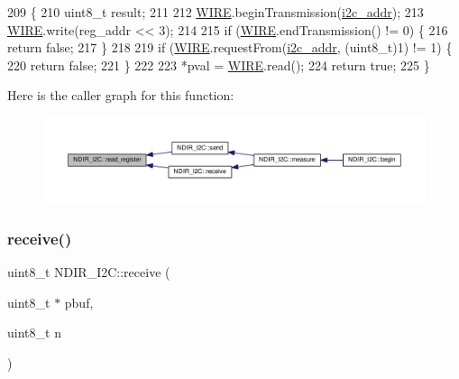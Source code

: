 \begin{DoxyCode}
209 \{
210     uint8\_t result;
211 
212     \hyperlink{_cool_n_d_i_r___i2_c_8cpp_a5fb65319d8f31c75826267805bb435d1}{WIRE}.beginTransmission(\hyperlink{class_n_d_i_r___i2_c_aac12069dd5a86a9ec6aa31ac9a44aabe}{i2c\_addr});
213     \hyperlink{_cool_n_d_i_r___i2_c_8cpp_a5fb65319d8f31c75826267805bb435d1}{WIRE}.write(reg\_addr << 3);
214 
215     \textcolor{keywordflow}{if} (\hyperlink{_cool_n_d_i_r___i2_c_8cpp_a5fb65319d8f31c75826267805bb435d1}{WIRE}.endTransmission() != 0) \{
216         \textcolor{keywordflow}{return} \textcolor{keyword}{false};
217     \}
218 
219     \textcolor{keywordflow}{if} (\hyperlink{_cool_n_d_i_r___i2_c_8cpp_a5fb65319d8f31c75826267805bb435d1}{WIRE}.requestFrom(\hyperlink{class_n_d_i_r___i2_c_aac12069dd5a86a9ec6aa31ac9a44aabe}{i2c\_addr}, (uint8\_t)1) != 1) \{
220         \textcolor{keywordflow}{return} \textcolor{keyword}{false};
221     \}
222 
223    *pval = \hyperlink{_cool_n_d_i_r___i2_c_8cpp_a5fb65319d8f31c75826267805bb435d1}{WIRE}.read();
224     \textcolor{keywordflow}{return} \textcolor{keyword}{true};
225 \}
\end{DoxyCode}
Here is the caller graph for this function\+:\nopagebreak
\begin{figure}[H]
\begin{center}
\leavevmode
\includegraphics[width=350pt]{d6/ddb/class_n_d_i_r___i2_c_aa72058e6e7c6174b14466fee4b2df1e0_icgraph}
\end{center}
\end{figure}
\mbox{\label{class_n_d_i_r___i2_c_aa6d2b8dd287f9c9015461cebb18f9abc}} 
\subsubsection{\texorpdfstring{receive()}{receive()}}
{\footnotesize\ttfamily uint8\+\_\+t N\+D\+I\+R\+\_\+\+I2\+C\+::receive (\begin{DoxyParamCaption}\item[{uint8\+\_\+t $\ast$}]{pbuf,  }\item[{uint8\+\_\+t}]{n }\end{DoxyParamCaption})\hspace{0.3cm}{\ttfamily [private]}}



